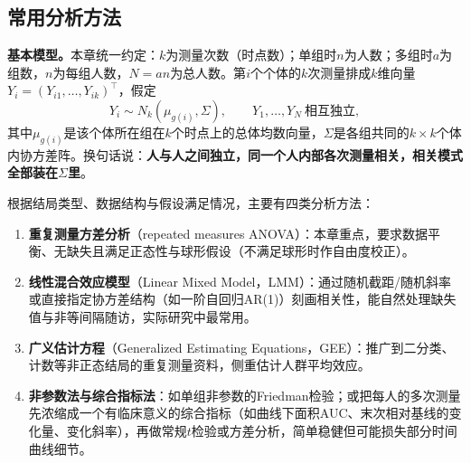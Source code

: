 \subsection{常用分析方法}
\textbf{基本模型。}本章统一约定：$k$为测量次数（时点数）；单组时$n$为人数；多组时$a$为组数，$n$为每组人数，$N=an$为总人数。第$i$个个体的$k$次测量排成$k$维向量$Y_i=(Y_{i1},\ldots,Y_{ik})^\top$，假定
\[
Y_i\sim N_k(\mu_{g(i)},\Sigma),\qquad Y_1,\ldots,Y_N\ \text{相互独立},
\]
其中$\mu_{g(i)}$是该个体所在组在$k$个时点上的总体均数向量，$\Sigma$是各组共同的$k\times k$个体内协方差阵。换句话说：\textbf{人与人之间独立，同一个人内部各次测量相关，相关模式全部装在$\Sigma$里}。

根据结局类型、数据结构与假设满足情况，主要有四类分析方法：
\begin{enumerate}
\item \textbf{重复测量方差分析}（repeated measures ANOVA）：本章重点，要求数据平衡、无缺失且满足正态性与球形假设（不满足球形时作自由度校正）。
\item \textbf{线性混合效应模型}（Linear Mixed Model，LMM）：通过随机截距/随机斜率或直接指定协方差结构（如一阶自回归AR(1)）刻画相关性，能自然处理缺失值与非等间隔随访，实际研究中最常用。
\item \textbf{广义估计方程}（Generalized Estimating Equations，GEE）：推广到二分类、计数等非正态结局的重复测量资料，侧重估计人群平均效应。
\item \textbf{非参数法与综合指标法}：如单组非参数的Friedman检验；或把每人的多次测量先浓缩成一个有临床意义的综合指标（如曲线下面积AUC、末次相对基线的变化量、变化斜率），再做常规$t$检验或方差分析，简单稳健但可能损失部分时间曲线细节。
\end{enumerate}
